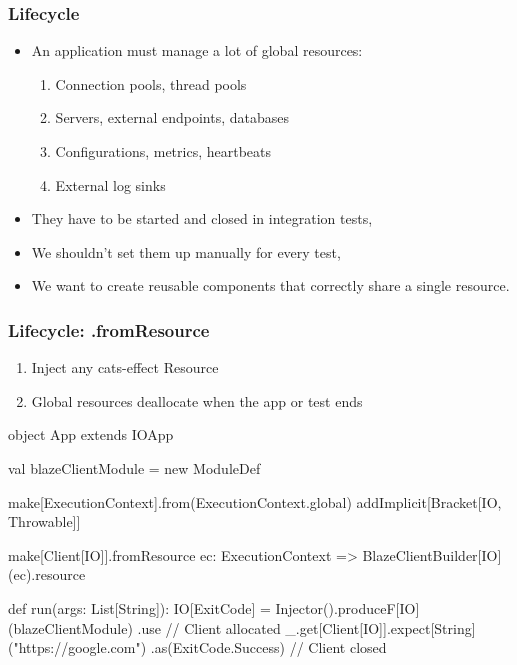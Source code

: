 \documentclass[usenames,dvipsnames]{beamer}
\begin{document}
\begin{frame}
\frametitle{Lifecycle}
  \begin{itemize}
    \item An application must manage a lot of global resources:
      \begin{enumerate}
      \item Connection pools, thread pools
      \item Servers, external endpoints, databases
      \item Configurations, metrics, heartbeats
      \item External log sinks
      \end{enumerate}
    \item They have to be started and closed in integration tests,
    \item We shouldn't set them up manually for every test,
    \item We want to create reusable components that correctly share a single resource.
  \end{itemize}
\end{frame}

\begin{frame}[fragile]
\frametitle{Lifecycle: .fromResource}
  \begin{enumerate}
    \item Inject any cats-effect Resource
    \item Global resources deallocate when the app or test ends
  \end{enumerate}

  \begin{scalacode}
object App extends IOApp {
  val blazeClientModule = new ModuleDef {
    make[ExecutionContext].from(ExecutionContext.global)
    addImplicit[Bracket[IO, Throwable]]

    make[Client[IO]].fromResource { ec: ExecutionContext =>
      BlazeClientBuilder[IO](ec).resource
  }}

  def run(args: List[String]): IO[ExitCode] =
    Injector().produceF[IO](blazeClientModule)
    .use { // Client allocated
      _.get[Client[IO]].expect[String]("https://google.com")
    }.as(ExitCode.Success) // Client closed
}
  \end{scalacode}
\end{frame}
\end{document}
